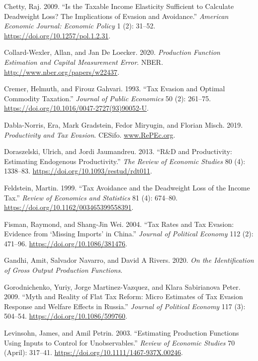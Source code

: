 \documentclass[
  12pt]{article}
\newlength{\cslhangindent}
\newenvironment{CSLReferences}[2] %
 {\begin{list}{}{%
  \setlength{\itemindent}{0pt}
  \setlength{\leftmargin}{0pt}
  \setlength{\parsep}{0pt}
  \ifodd #1
   \setlength{\leftmargin}{\cslhangindent}
   \setlength{\itemindent}{-1\cslhangindent}
  \fi
  \setlength{\itemsep}{#2\baselineskip}}}
 {\end{list}}
\begin{document}
\begin{CSLReferences}{1}{1}
Chetty, Raj. 2009. {``Is the Taxable Income Elasticity Sufficient to
Calculate Deadweight Loss? The Implications of Evasion and Avoidance.''}
\emph{American Economic Journal: Economic Policy} 1 (2): 31--52.
\url{https://doi.org/10.1257/pol.1.2.31}.

Collard-Wexler, Allan, and Jan De Loecker. 2020. \emph{Production
Function Estimation and Capital Measurement Error}. NBER.
\url{http://www.nber.org/papers/w22437}.

Cremer, Helmuth, and Firouz Gahvari. 1993. {``Tax Evasion and Optimal
Commodity Taxation.''} \emph{Journal of Public Economics} 50 (2):
261--75. \url{https://doi.org/10.1016/0047-2727(93)90052-U}.

Dabla-Norris, Era, Mark Gradstein, Fedor Miryugin, and Florian Misch.
2019. \emph{Productivity and Tax Evasion}. CESifo.
\href{https://www.RePEc.org}{www.RePEc.org}.

Doraszelski, Ulrich, and Jordi Jaumandreu. 2013. {``{R\&D} and
Productivity: Estimating Endogenous Productivity.''} \emph{The Review of
Economic Studies} 80 (4): 1338--83.
\url{https://doi.org/10.1093/restud/rdt011}.

Feldstein, Martin. 1999. {``Tax Avoidance and the Deadweight Loss of the
Income Tax.''} \emph{Review of Economics and Statistics} 81 (4):
674--80. \url{https://doi.org/10.1162/003465399558391}.

Fisman, Raymond, and Shang-Jin Wei. 2004. {``Tax Rates and Tax Evasion:
Evidence from {`Missing Imports'} in {China}.''} \emph{Journal of
Political Economy} 112 (2): 471--96.
\url{https://doi.org/10.1086/381476}.

Gandhi, Amit, Salvador Navarro, and David A Rivers. 2020. \emph{On the
Identification of Gross Output Production Functions}.

Gorodnichenko, Yuriy, Jorge Martinez-Vazquez, and Klara Sabirianova
Peter. 2009. {``Myth and Reality of Flat Tax Reform: Micro Estimates of
Tax Evasion Response and Welfare Effects in {Russia}.''} \emph{Journal
of Political Economy} 117 (3): 504--54.
\url{https://doi.org/10.1086/599760}.

Levinsohn, James, and Amil Petrin. 2003. {``Estimating Production
Functions Using Inputs to Control for Unobservables.''} \emph{Review of
Economic Studies} 70 (April): 317--41.
\url{https://doi.org/10.1111/1467-937X.00246}.


\end{CSLReferences}
\end{document}
